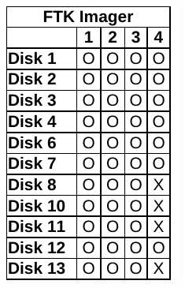 \begin{paraphrase}
\begin{figure}
\begin{subfigure}{0.17\linewidth}
        \includegraphics[width=\linewidth]{fig/ftk_results_ntfs.pdf}
    \end{subfigure}~~
    \begin{subfigure}{0.17\linewidth}

\end{subfigure}
\end{figure}
\end{paraphrase}
